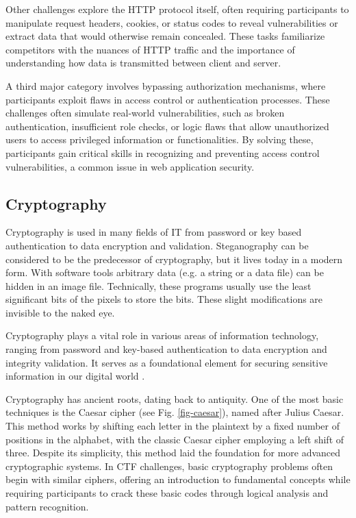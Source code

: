 \documentclass[conference]{IEEEtran}
\begin{document}
Other challenges explore the HTTP protocol itself, often requiring participants
to manipulate request headers, cookies, or status codes to reveal
vulnerabilities or extract data that would otherwise remain concealed. These
tasks familiarize competitors with the nuances of HTTP traffic and the
importance of understanding how data is transmitted between client and server.

A third major category involves bypassing authorization mechanisms, where
participants exploit flaws in access control or authentication processes. These
challenges often simulate real-world vulnerabilities, such as broken
authentication, insufficient role checks, or logic flaws that allow
unauthorized users to access privileged information or functionalities. By
solving these, participants gain critical skills in recognizing and preventing
access control vulnerabilities, a common issue in web application security.

\subsection{Cryptography}

Cryptography is used in many fields of IT from password or key based authentication
to data encryption and validation. Steganography can be considered to be the
predecessor of cryptography, but it lives today in a modern form. With software
tools arbitrary data (e.g. a string or a data file) can be hidden in an image file.
Technically, these programs usually use the least significant bits of the pixels
to store the bits. These slight modifications are invisible to the naked eye.

Cryptography plays a vital role in various areas of information technology,
ranging from password and key-based authentication to data encryption and
integrity validation. It serves as a foundational element for securing
sensitive information in our digital world
\cite{luciano1987}.

Cryptography has ancient roots, dating back to antiquity. One of the most basic
techniques is the Caesar cipher (see Fig. \ref{fig-caesar}),
named after Julius Caesar. This method works
by shifting each letter in the plaintext by a fixed number of positions in the
alphabet, with the classic Caesar cipher employing a left shift of three.
Despite its simplicity, this method laid the foundation for more advanced
cryptographic systems. In CTF challenges, basic cryptography problems often
begin with similar ciphers, offering an introduction to fundamental concepts
while requiring participants to crack these basic codes through logical
analysis and pattern recognition.
\end{document}
